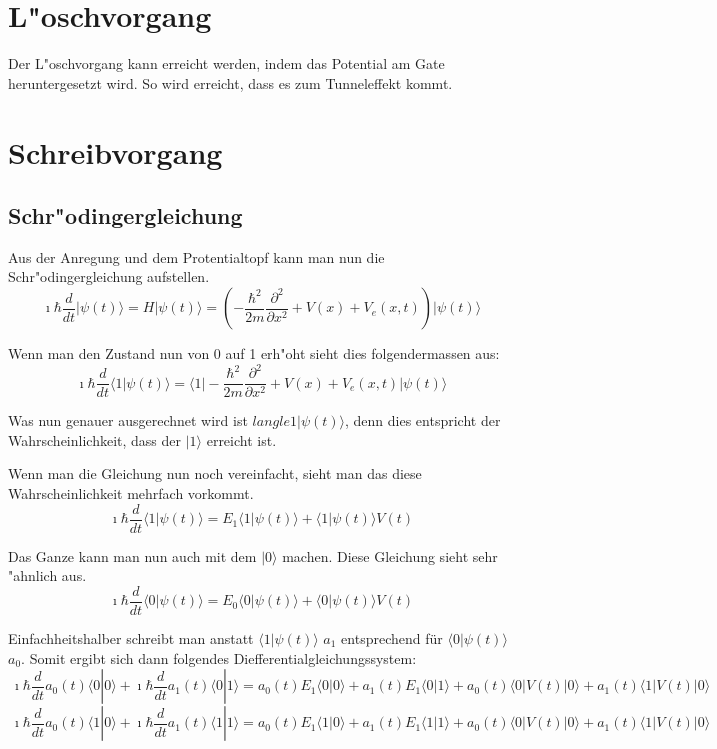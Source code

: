 \begin{refsection}
\section{L"oschvorgang}
Der L"oschvorgang kann erreicht werden, indem das Potential am Gate heruntergesetzt wird. So wird erreicht, dass es zum Tunneleffekt kommt. 


\section{Schreibvorgang}

\subsection{Schr"odingergleichung}
Aus der Anregung und dem Protentialtopf kann man nun die Schr"odingergleichung aufstellen.
\[
\ \imath\hbar\frac{d}{dt}|\psi(t)\rangle = H|\psi(t)\rangle = (-\frac{\hbar^2}{2m} \frac{\partial^2}{\partial x^2}+V(x)+V_{e}(x,t))|\psi(t)\rangle
\]

Wenn man den Zustand nun von 0 auf 1 erh"oht sieht dies folgendermassen aus:
\[
\ \imath\hbar\frac{d}{dt}\langle1|\psi(t)\rangle = \langle1|-\frac{\hbar^2}{2m} \frac{\partial^2}{\partial x^2}+V(x)+V_{e}(x,t)|\psi(t)\rangle
\]

Was nun genauer ausgerechnet wird ist $langle1|\psi(t)\rangle$, denn dies entspricht der Wahrscheinlichkeit, dass der $|1\rangle$ erreicht ist.

Wenn man die Gleichung nun noch vereinfacht, sieht man das diese Wahrscheinlichkeit mehrfach vorkommt.
\[
\ \imath\hbar\frac{d}{dt}\langle1|\psi(t)\rangle = E_{1}\langle1|\psi(t)\rangle+\langle1|\psi(t)\rangle V(t)
\]

Das Ganze kann man nun auch mit dem $|0\rangle$ machen. Diese Gleichung sieht sehr "ahnlich aus.
\[
\ \imath\hbar\frac{d}{dt}\langle0|\psi(t)\rangle = E_{0}\langle0|\psi(t)\rangle+\langle0|\psi(t)\rangle V(t)
\]

Einfachheitshalber schreibt man anstatt $\langle1|\psi(t)\rangle$ $a_1$ entsprechend für $\langle0|\psi(t)\rangle$ $a_0$. Somit ergibt sich dann folgendes Diefferentialgleichungssystem:
\[
\ \imath\hbar\frac{d}{dt}a_{0}(t)\langle0|0\rangle +\imath\hbar\frac{d}{dt}a_{1}(t)\langle0|1\rangle = a_{0}(t)E_{1}\langle0|0\rangle + a_{1}(t)E_{1}\langle0|1\rangle + a_{0}(t)\langle0|V(t)|0\rangle+ a_{1}(t)\langle1|V(t)|0\rangle
\]
\[
\ \imath\hbar\frac{d}{dt}a_{0}(t)\langle1|0\rangle +\imath\hbar\frac{d}{dt}a_{1}(t)\langle1|1\rangle = a_{0}(t)E_{1}\langle1|0\rangle + a_{1}(t)E_{1}\langle1|1\rangle + a_{0}(t)\langle0|V(t)|0\rangle+ a_{1}(t)\langle1|V(t)|0\rangle
\]


\end{refsection}
